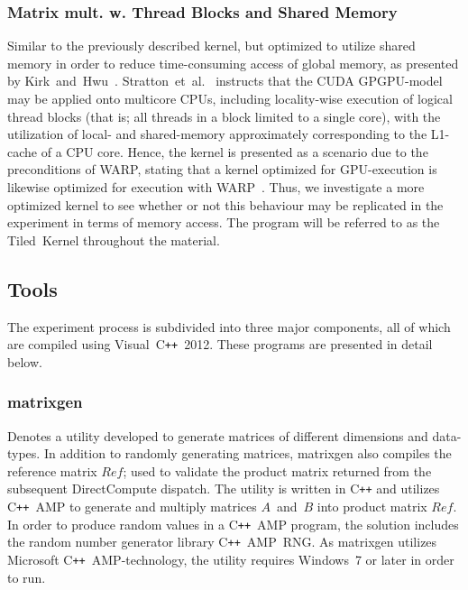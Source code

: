 \subsubsection{Matrix mult. w. Thread Blocks and Shared Memory}
Similar to the previously described kernel, but optimized to utilize shared memory in order to reduce time-consuming access of global memory, as presented by Kirk~and~Hwu~\cite[p.~77-93]{Kirk:2010:PMP:1841511}.
Stratton~et~al.~\cite[p.~1-3]{Stratton:2008:MEI:1485701.1485703} instructs that the CUDA GPGPU-model may be applied onto multicore CPUs, including locality-wise execution of logical thread blocks (that is; all threads in a block limited to a single core), with the utilization of local- and shared-memory approximately corresponding to the L1-cache of a CPU core.
Hence, the kernel is presented as a scenario due to the preconditions of WARP, stating that a kernel optimized for GPU-execution is likewise optimized for execution with WARP~.
Thus, we investigate a more optimized kernel to see whether or not this behaviour may be replicated in the experiment in terms of memory access.
The program will be referred to as the Tiled~Kernel throughout the material.

\subsection{Tools}
\label{sec:contribution:tools}
The experiment process is subdivided into three major components, all of which are compiled using Visual~C\texttt{++}~2012.
These programs are presented in detail below.

\subsubsection{matrixgen}
Denotes a utility developed to generate matrices of different dimensions and data-types.
In addition to randomly generating matrices, matrixgen also compiles the reference matrix $Ref$; used to validate the product matrix returned from the subsequent DirectCompute dispatch.
The utility is written in C\texttt{++} and utilizes C\texttt{++}~AMP to generate and multiply matrices $A$~and~$B$ into product matrix $Ref$.
In order to produce random values in a C\texttt{++}~AMP program, the solution includes the random number generator library C\texttt{++}~AMP~RNG.
As matrixgen utilizes Microsoft C\texttt{++}~AMP-technology, the utility requires Windows~7 or later in order to run.

